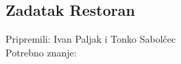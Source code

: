 \subsection*{Zadatak Restoran}
\textsf{Pripremili: Ivan Paljak i Tonko Sabolčec}\\
\textsf{Potrebno znanje: }
